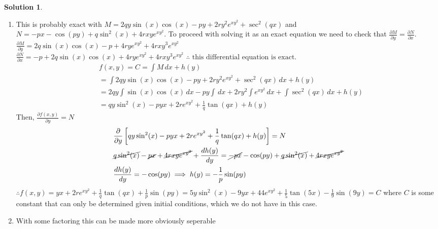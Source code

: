 \documentclass[10pt]{article}
\theoremstyle{definition}
\newtheorem{soln}{Solution}
\begin{document}
\begin{soln} ~\\
  \begin{enumerate}[label=(\alph*)]
    \item This is probably exact with $\displaystyle M=2qy\sin(x)\cos(x)-py+2ry^2e^{xy^2}+\sec^2(qx)$ and $N=-px-\cos(py)+q\sin^2(x)+4rxye^{xy^2}$.
          To proceed with solving it as an exact equation we need to check that $\displaystyle\frac{\partial M}{\partial y}=\frac{\partial N}{\partial x}$.
          $\displaystyle\frac{\partial M}{\partial y} =2q\sin(x)\cos(x)-p+4rye^{xy^2}+4rxy^3e^{xy^2}$ \\
          $\displaystyle\frac{\partial N}{\partial x} =-p+2q\sin(x)\cos(x)+4rye^{xy^2}+4rxy^3e^{xy^2}$ $\therefore \text{ this differential equation is exact.}$
          \begin{align*}
             & f(x,y)=C=\int M \,dx + h(y)                                                                       \\
             & =\int 2qy\sin(x)\cos(x)-py+2ry^2e^{xy^2}+\sec^2(qx) \,dx + h(y)                                   \\
             & =2qy\int \sin(x)\cos(x) \,dx - py\int \,dx + 2ry^2\int e^{xy^2} \,dx + \int\sec^2(qx) \,dx + h(y) \\
             & =qy\sin^2(x) - pyx + 2re^{xy^2} + \frac{1}{q}\tan(qx) + h(y)
          \end{align*}
          Then, $\displaystyle \frac{\partial f(x,y)}{\partial y}=N$
          \begin{align*}
             & \frac{\partial }{\partial y}\left[qy\sin^2(x) - pyx + 2re^{xy^2} + \frac{1}{q}\tan(qx) + h(y)\right]=N                                                     \\
             & \cancel{q\sin^2(x)} - \cancel{px} + \cancel{4rxye^{xy^2}} + \frac{dh(y)}{dy} =\cancel{-px}-\cos(py)+\cancel{q\sin^2(x)}+\cancel{4rxye^{xy^2} } \\
             & \frac{dh(y)}{dy} =-\cos(py) \implies h(y)=-\frac{1}{p}\sin(py)
          \end{align*}
          $\displaystyle\therefore f(x,y)=yx + 2re^{xy^2} + \frac{1}{q}\tan(qx) + \frac{1}{p}\sin(py)=5y\sin^2(x) - 9yx + 44e^{xy^2} + \frac{1}{5}\tan(5x) - \frac{1}{9}\sin(9y)=C$ where $C$ is some constant that can only be determined given
          initial conditions, which we do not have in this case. \newpage
    \item With some factoring this can be made more obviously seperable

\end{enumerate}
\end{soln}
\end{document}
